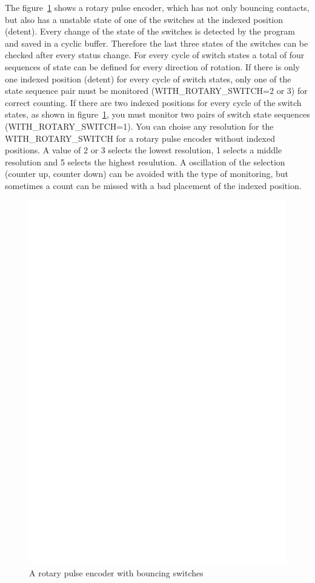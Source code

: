 The figure~\ref{fig:RotBounce} shows a rotary pulse encoder, which has not only
bouncing contacts, but also has a unstable state of one of the switches at the indexed
position (detent). Every change of the state of the switches is detected by the program
and saved in a cyclic buffer. Therefore the last three states of the switches can be checked
after every status change.
For every cycle of switch states a total of four sequences of state can be defined for every direction of rotation.
If there is only one indexed position (detent) for every cycle of switch states, only
one of the state sequence pair must be monitored (WITH\_ROTARY\_SWITCH=2 or 3) for correct counting.
If there are two indexed positions for every cycle of the switch states, as shown in figure~\ref{fig:RotBounce},
you must monitor two pairs of switch state sequences (WITH\_ROTARY\_SWITCH=1).
You can choise any resolution for the WITH\_ROTARY\_SWITCH for a rotary pulse encoder without
indexed positions. A value of 2 or 3 selects the lowest resolution, 1 selects a middle resolution
and 5 selects the highest resulution.
A oscillation of the selection (counter up, counter down) can be avoided with the type of monitoring,
but sometimes a count can be missed with a bad placement of the indexed position.

\begin{figure}[H]
\centering
\includegraphics[width=14cm]{../FIG/rotary_bouncing.eps}
\caption{A rotary pulse encoder with bouncing switches}
\label{fig:RotBounce}
\end{figure}

